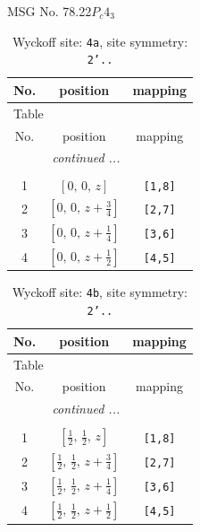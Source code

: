\documentclass[fleqn,8pt]{jsarticle}
\begin{document}
\setcounter{MaxMatrixCols}{32}

\renewcommand{\tablename}{Table~}
\renewcommand{\figurename}{Figure~}
\begin{center}
\LARGE
MSG No. 78.22\quad$P_{c}4_{3}$
\end{center}
\renewcommand{\arraystretch}{1.2}
\begin{longtable}{ccc}
\caption{Wyckoff site: {\tt 4a}, site symmetry: {\tt 2'..}}
 \\
 \hline \hline
No. & position & mapping \\ \hline \endfirsthead

\multicolumn{2}{l}{\tablename\ \thetable{}} \\
 \hline \hline
No. & position & mapping \\ \hline \endhead

 \hline \hline
\multicolumn{2}{r}{\footnotesize\it continued ...} \\ \endfoot

 \hline \hline
\multicolumn{2}{r}{} \\ \endlastfoot

1 & $\left[ 0,\, 0,\, z \right]$ & {\tt [1,8]} \\ \hline
2 & $\left[ 0,\, 0,\, z + \frac{3}{4} \right]$ & {\tt [2,7]} \\ \hline
3 & $\left[ 0,\, 0,\, z + \frac{1}{4} \right]$ & {\tt [3,6]} \\ \hline
4 & $\left[ 0,\, 0,\, z + \frac{1}{2} \right]$ & {\tt [4,5]} \\
\end{longtable}
\renewcommand{\arraystretch}{1.2}
\begin{longtable}{ccc}
\caption{Wyckoff site: {\tt 4b}, site symmetry: {\tt 2'..}}
 \\
 \hline \hline
No. & position & mapping \\ \hline \endfirsthead

\multicolumn{2}{l}{\tablename\ \thetable{}} \\
 \hline \hline
No. & position & mapping \\ \hline \endhead

 \hline \hline
\multicolumn{2}{r}{\footnotesize\it continued ...} \\ \endfoot

 \hline \hline
\multicolumn{2}{r}{} \\ \endlastfoot

1 & $\left[ \frac{1}{2},\, \frac{1}{2},\, z \right]$ & {\tt [1,8]} \\ \hline
2 & $\left[ \frac{1}{2},\, \frac{1}{2},\, z + \frac{3}{4} \right]$ & {\tt [2,7]} \\ \hline
3 & $\left[ \frac{1}{2},\, \frac{1}{2},\, z + \frac{1}{4} \right]$ & {\tt [3,6]} \\ \hline
4 & $\left[ \frac{1}{2},\, \frac{1}{2},\, z + \frac{1}{2} \right]$ & {\tt [4,5]} \\
\end{longtable}
\end{document}

